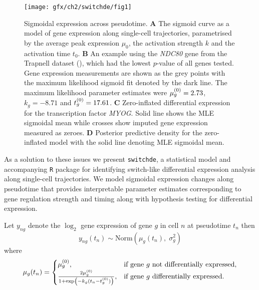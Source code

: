 \begin{figure}[!h]
\centering
\texttt{[image: gfx/ch2/switchde/fig1]}
\caption[Sigmoidal expression across pseudotime.]{Sigmoidal expression across pseudotime.
\textbf{A} The sigmoid curve as a model of gene expression along single-cell trajectories, parametrised by the average peak expression $\mu_0$, the activation strength $k$ and the activation time $t_0$.
\textbf{B} An example using the \emph{NDC80} gene from the Trapnell dataset (\cite{Trapnell2014-xi}), which had the lowest $p$-value of all genes tested. Gene expression measurements are shown as the grey points with the maximum likelihood sigmoid fit denoted by the dark line. The maximum likelihood parameter estimates were ${\mu^{(0)}_g} = 2.73$, $k_g = -8.71$ and ${t^{(0)}_g} = 17.61$.
\textbf{C} Zero-inflated differential expression for the transcription factor \emph{MYOG}. Solid line shows the MLE sigmoidal mean while  crosses show imputed gene expression measured as zeroes.
\textbf{D} Posterior predictive density for the zero-inflated model with the solid line denoting MLE sigmoidal mean.
}\label{fig:01}
\end{figure}


As a solution to these issues we present \texttt{switchde}, a statistical model and accompanying \texttt{R} package for identifying switch-like differential expression analysis along single-cell trajectories. We model sigmoidal expression changes along pseudotime that provides interpretable parameter estimates corresponding to gene regulation strength and timing along with hypothesis testing for differential expression.



Let $y_{ng}$ denote the $\log_2$ gene expression of gene $g$ in cell $n$ at pseudotime $t_n$ then
\begin{equation} \label{eq:nzi}
y_{ng}(t_n) \sim \mathrm{Norm}(\mu_g(t_n), \; \sigma_g^2)
\end{equation}
where
\begin{equation}
    \mu_g(t_n) =
\begin{cases}
    \hfil  \mu^{(0)}_g, & \text{if } \text{gene $g$ not differentially expressed},  \\
    \frac{2 \mu^{(0)}_g}{1 + \exp\left(-k_g(t_n - t^{(0)}_g)\right)}, &  \text{if gene $g$ differentially expressed}.
\end{cases}
\end{equation}

